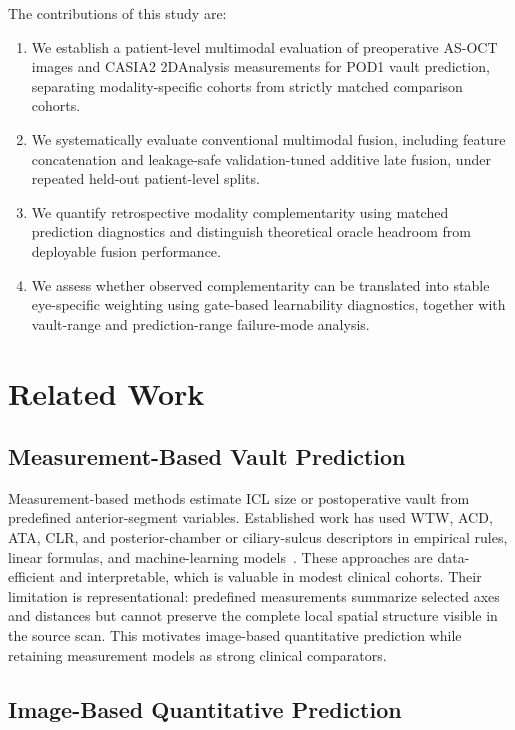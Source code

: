 \documentclass[10pt,twocolumn]{article}
\begin{document}
The contributions of this study are:
\begin{enumerate}
    \item We establish a patient-level multimodal evaluation of preoperative AS-OCT images and CASIA2 2DAnalysis measurements for POD1 vault prediction, separating modality-specific cohorts from strictly matched comparison cohorts.
    \item We systematically evaluate conventional multimodal fusion, including feature concatenation and leakage-safe validation-tuned additive late fusion, under repeated held-out patient-level splits.
    \item We quantify retrospective modality complementarity using matched prediction diagnostics and distinguish theoretical oracle headroom from deployable fusion performance.
    \item We assess whether observed complementarity can be translated into stable eye-specific weighting using gate-based learnability diagnostics, together with vault-range and prediction-range failure-mode analysis.
\end{enumerate}

\section{Related Work}

\subsection{Measurement-Based Vault Prediction}

Measurement-based methods estimate ICL size or postoperative vault from predefined anterior-segment variables. Established work has used WTW, ACD, ATA, CLR, and posterior-chamber or ciliary-sulcus descriptors in empirical rules, linear formulas, and machine-learning models~\cite{icl_vault_biometry,nakamura_icl_sizing,yang_vault_formula,wu_vault_formula}. These approaches are data-efficient and interpretable, which is valuable in modest clinical cohorts. Their limitation is representational: predefined measurements summarize selected axes and distances but cannot preserve the complete local spatial structure visible in the source scan. This motivates image-based quantitative prediction while retaining measurement models as strong clinical comparators.

\subsection{Image-Based Quantitative Prediction}
\end{document}
